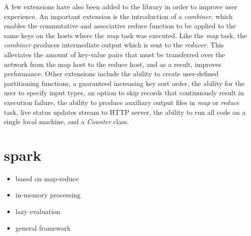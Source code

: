 \documentclass{report}
\begin{document}
        A few extensions have also been added to the library in order to improve
        user experience. An important extension is the introduction of a
        \textit{combiner}, which enables the commutative and associative reduce
        function to be applied to the same keys on the hosts where the
        \textit{map} task was executed. Like the \textit{map} task, the
        \textit{combiner} produces intermediate output which is sent to the
        \textit{reducer}. This alleviates the amount of key-value pairs that
        must be transferred over the network from the map host to the reduce
        host, and as a result, improves performance. Other extensions include
        the ability to create user-defined partitioning functions, a guaranteed
        increasing key sort order, the ability for the user to specify input
        types, an option to skip records that continuously result in execution
        failure, the ability to produce auxiliary output files in \textit{map}
        or \textit{reduce} task, live status updates stream to HTTP server, the
        ability to run all code on a single local machine, and a
        \textit{Counter} class.  \section{spark} \begin{itemize} \item based on
        map-reduce \item in-memory processing \item lazy evaluation \item
        general framework \end{itemize} 
\end{document}
